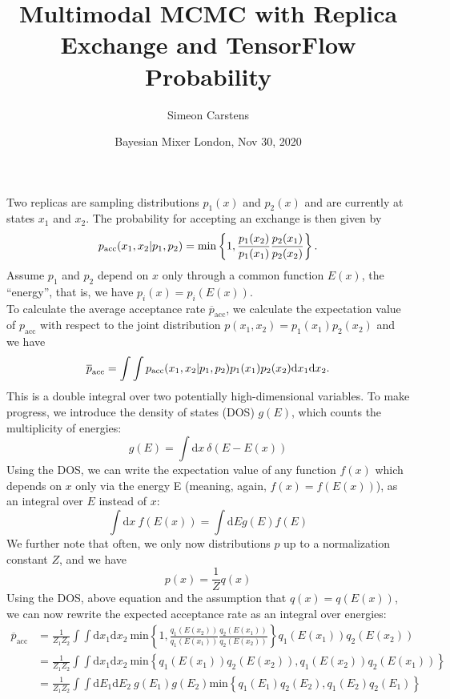 \documentclass{article}
\title{Multimodal MCMC with Replica Exchange and TensorFlow Probability}
\date{Bayesian Mixer London, Nov 30, 2020}
\author{Simeon Carstens}
\renewcommand{\d}{\mathrm{d}}
\begin{document}
Two replicas are sampling distributions $p_1(x)$ and $p_2(x)$ and are currently at states $x_1$ and $x_2$. The probability for accepting an exchange is then given by
\begin{equation}
  p_{\mathrm{acc}}(x_1, x_2|p_1, p_2) = \mathrm{min}\left\{1, \frac{p_1(x_2)}{p_1(x_1)} \frac{p_2(x_1)}{p_2(x_2)}\right\} \mbox .
\end{equation}
Assume $p_1$ and $p_2$ depend on $x$ only through a common function $E(x)$, the ``energy'', that is, we have $p_i(x)=p_i(E(x))$. \\
To calculate the average acceptance rate $\overline{p}_{\mathrm{acc}}$, we calculate the expectation value of $p_{\mathrm{acc}}$ with respect to the joint distribution $p(x_1, x_2)=p_1(x_1)p_2(x_2)$ and we have
\begin{equation}
  \overline{p}_{\mathrm{acc}} = \int \int p_{\mathrm{acc}}(x_1, x_2|p_1, p_2) p_1(x_1)p_2(x_2)\d x_1 \d x_2 \mbox .
\end{equation}
This is a double integral over two potentially high-dimensional variables. To make progress, we introduce the density of states (DOS) $g(E)$, which counts the multiplicity of energies:
\begin{equation}
  g(E) = \int \d x \ \delta(E-E(x))
\end{equation}
Using the DOS, we can write the expectation value of any function $f(x)$ which depends on $x$ only via the energy E (meaning, again, $f(x)=f(E(x))$), as an integral over $E$ instead of $x$:
\begin{equation}
  \int \d x \ f(E(x)) = \int \d E g(E) f(E)
\end{equation}
We further note that often, we only now distributions $p$ up to a normalization constant $Z$, and we have
\begin{equation}
  p(x) = \frac{1}{Z}q(x)
\end{equation}
Using the DOS, above equation and the assumption that $q(x)=q(E(x))$, we can now rewrite the expected acceptance rate as an integral over energies:
\begin{eqnarray}
  \overline{p}_{\mathrm{acc}} &= \frac{1}{Z_1 Z_2} \int \int \d x_1 \d x_2 \ \mathrm{min}\left\{1, \frac{q_1(E(x_2))}{q_1(E(x_1))} \frac{q_2(E(x_1))}{q_2(E(x_2))}\right\} q_1(E(x_1)) q_2(E(x_2)) \\
                              &= \frac{1}{Z_1 Z_2} \int \int \d x_1 \d x_2 \ \mathrm{min}\left\{q_1(E(x_1)) q_2(E(x_2)), q_1(E(x_2)) q_2(E(x_1))\right\} \\
  &= \frac{1}{Z_1 Z_2} \int \int \d E_1 \d E_2 \ g(E_1) g(E_2) \mathrm{min}\left\{q_1(E_1) q_2(E_2), q_1(E_2) q_2(E_1)\right\}
\end{eqnarray}
\end{document}
